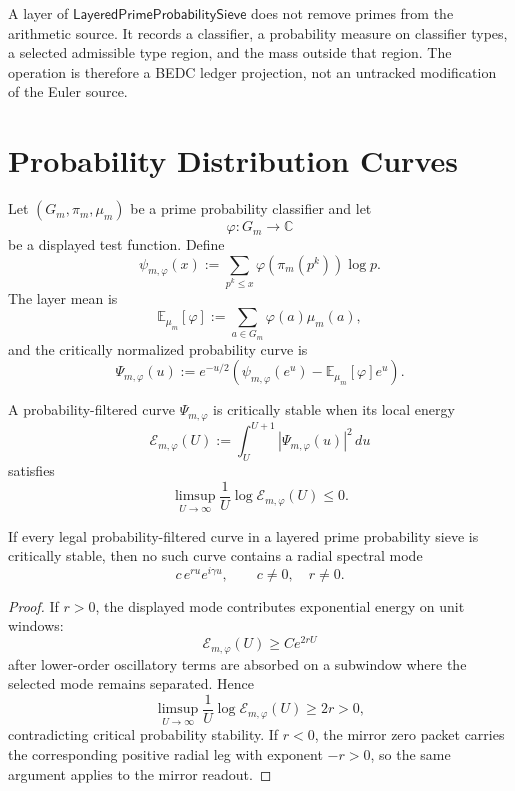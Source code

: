 \begin{principle}
\label{prin:rh-sieve-steps-are-probability-projections}
A layer of $\mathsf{LayeredPrimeProbabilitySieve}$ does not remove
primes from the arithmetic source.  It records a classifier, a
probability measure on classifier types, a selected admissible type
region, and the mass outside that region.  The operation is therefore a
BEDC ledger projection, not an untracked modification of the Euler
source.
\end{principle}

\section{Probability Distribution Curves}
\label{sec:rh-layered-prime-probability-curves}

\begin{definition}
\label{def:rh-probability-filtered-chebyshev-curve}
Let $(G_m,\pi_m,\mu_m)$ be a prime probability classifier and let
$$
\varphi:G_m\to\mathbb C
$$
be a displayed test function.  Define
$$
\psi_{m,\varphi}(x)
:=
\sum_{p^k\le x}\varphi(\pi_m(p^k))\log p.
$$
The layer mean is
$$
\mathbb E_{\mu_m}[\varphi]
:=
\sum_{a\in G_m}\varphi(a)\mu_m(a),
$$
and the critically normalized probability curve is
$$
\Psi_{m,\varphi}(u)
:=
e^{-u/2}
\left(
\psi_{m,\varphi}(e^u)
-
\mathbb E_{\mu_m}[\varphi]e^u
\right).
$$
\end{definition}

\begin{definition}
\label{def:rh-critical-probability-stability}
A probability-filtered curve $\Psi_{m,\varphi}$ is critically stable
when its local energy
$$
\mathcal E_{m,\varphi}(U)
:=
\int_U^{U+1}|\Psi_{m,\varphi}(u)|^2\,du
$$
satisfies
$$
\limsup_{U\to\infty}
\frac1U\log \mathcal E_{m,\varphi}(U)
\le0.
$$
\end{definition}

\begin{theorem}
\label{thm:rh-critical-probability-stability-excludes-radial-modes}
If every legal probability-filtered curve in a layered prime
probability sieve is critically stable, then no such curve contains a
radial spectral mode
$$
c\,e^{ru}e^{i\gamma u},
\qquad
c\ne0,\quad r\ne0.
$$
\end{theorem}

\begin{proof}
If $r>0$, the displayed mode contributes exponential energy on unit
windows:
$$
\mathcal E_{m,\varphi}(U)\ge C e^{2rU}
$$
after lower-order oscillatory terms are absorbed on a subwindow where
the selected mode remains separated.  Hence
$$
\limsup_{U\to\infty}
\frac1U\log\mathcal E_{m,\varphi}(U)
\ge 2r>0,
$$
contradicting critical probability stability.  If $r<0$, the mirror
zero packet carries the corresponding positive radial leg with
exponent $-r>0$, so the same argument applies to the mirror readout.
\end{proof}

